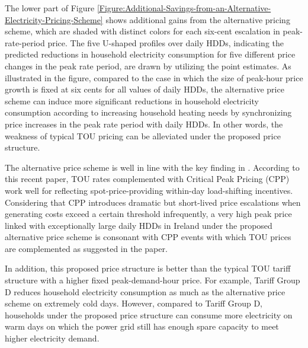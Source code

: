 The lower part of Figure \ref{Figure:Additional-Savings-from-an-Alternative-Electricity-Pricing-Scheme} shows additional gains from the alternative pricing scheme, which are shaded with distinct colors for each six-cent escalation in peak-rate-period price. The five U-shaped profiles over daily HDDs, indicating the predicted reductions in household electricity consumption for five different price changes in the peak rate period, are drawn by utilizing the point estimates. As illustrated in the figure, compared to the case in which the size of peak-hour price growth is fixed at six cents for all values of daily HDDs, the alternative price scheme can induce more significant reductions in household electricity consumption according to increasing household heating needs by synchronizing price increases in the peak rate period with daily HDDs. In other words, the weakness of typical TOU pricing can be alleviated under the proposed price structure. 

The alternative price scheme is well in line with the key finding in \cite{Electricity-Retail-Rate-Design-in-a-Decarbonized-Economy_Schittekatte-et-al_2022}. According to this recent paper, TOU rates complemented with Critical Peak Pricing (CPP) work well for reflecting spot-price-providing within-day load-shifting incentives. Considering that CPP introduces dramatic but short-lived price escalations when generating costs exceed a certain threshold infrequently, a very high peak price linked with exceptionally large daily HDDs in Ireland under the proposed alternative price scheme is consonant with CPP events with which TOU prices are complemented as suggested in the paper. 

In addition, this proposed price structure is better than the typical TOU tariff structure with a higher fixed peak-demand-hour price. For example, Tariff Group D reduces household electricity consumption as much as the alternative price scheme on extremely cold days. However, compared to Tariff Group D, households under the proposed price structure can consume more electricity on warm days on which the power grid still has enough spare capacity to meet higher electricity demand. 
